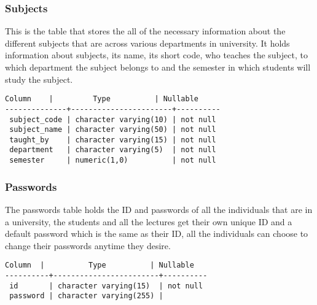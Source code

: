 \newpage
\subsubsection{Subjects}

This is the table that stores the all of the necessary information about the
different subjects that are across various departments in university. It holds
information about subjects, its name, its short code, who teaches the subject,
to which department the subject belongs to and the semester in which students
will study the subject.

\begin{lstlisting}[basicstyle=\small]
    Column    |         Type          | Nullable
--------------+-----------------------+----------
 subject_code | character varying(10) | not null
 subject_name | character varying(50) | not null
 taught_by    | character varying(15) | not null
 department   | character varying(5)  | not null
 semester     | numeric(1,0)          | not null
\end{lstlisting}

\subsubsection{Passwords}

The passwords table holds the ID and passwords of all the individuals that are
in a university, the students and all the lectures get their own unique ID and
a default password which is the same as their ID, all the individuals can choose
to change their passwords anytime they desire.

\begin{lstlisting}[basicstyle=\small]
  Column  |          Type          | Nullable
----------+------------------------+----------
 id       | character varying(15)  | not null
 password | character varying(255) |
\end{lstlisting}
